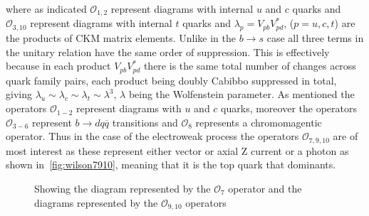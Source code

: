 where as indicated $\mathcal{O}_{1,2}$ represent diagrams with internal $u$ and $c$ quarks and $\mathcal{O}_{3,10}$ represent diagrams with internal $t$ quarks and $\lambda_{p} = V_{pb}V^{*}_{pd}$, ($p = u,c,t$) are the products of CKM matrix elements. Unlike in the $b\to s$ case all three terms in the unitary relation have the same order of suppression. This is effectively because in each product $V_{pb}V^{*}_{pd}$ there is the same total number of changes across quark family pairs, each product being doubly Cabibbo suppressed in total, giving $\lambda_{u} \sim \lambda_{c} \sim \lambda_{t} \sim \lambda^{3}$, $\lambda$ being the Wolfenstein parameter. As mentioned the operators $\mathcal{O}_{1-2}$ represent diagrams with $u$ and $c$ quarks, moreover the operators $\mathcal{O}_{3-6}$ represent $b\to dq\overline{q}$ transitions and $\mathcal{O}_{8}$ represents a chromomagentic operator. Thus in the case of the electroweak process the operators $\mathcal{O}_{7,9,10}$ are of most interest as these represent either vector or axial Z current or a photon as shown in~\autoref{fig:wilson7910}, meaning that it is the top quark that dominants.
\begin{figure}[ht!]
    \centering
  \hspace*{-2cm}
           \caption{Showing \protect{} the diagram represented by the $\mathcal{O}_{7}$ operator and\protect{} the diagrams represented by the $\mathcal{O}_{9,10}$ operators~\cite{lowrecoil}}
           \label{fig:wilson7910}
\end{figure}


